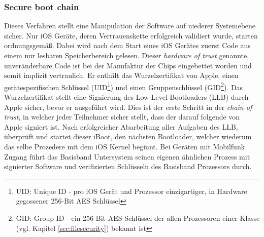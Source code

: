 	\subsubsection{Secure boot chain}\label{sec:secure-boot-chain}
		Dieses Verfahren stellt eine Manipulation der Software auf niederer
		Systemebene sicher.
		Nur iOS Geräte, deren Vertrauenskette erfolgreich validiert wurde, starten
		ordnungsgemäß. Dabei wird nach dem Start eines iOS Gerätes zuerst Code aus
		einem nur lesbaren Speicherbereich gelesen. Dieser \textit{hardware of
		trust} genannte, unveränderbare Code ist bei der
		Manufaktur der Chips eingebettet worden und somit implizit vertraulich.
		Er enthält das Wurzelzertifikat von Apple, einen gerätespezifischen
		Schlüssel (UID\footnote{UID: Unique ID - pro iOS Gerät und Prozessor einzigartiger,
		in Hardware gegossener 256-Bit AES Schlüssel}) und einen Gruppenschlüssel
		(GID\footnote{GID: Group ID - ein 256-Bit AES Schlüssel der allen
		Prozessoren einer Klasse (vgl. Kapitel \ref{sec:filesecurity}) bekannt ist}).
		Das Wurzelzertifikat stellt eine Signierung des Low-Level-Bootloaders (LLB)
		durch Apple sicher, bevor er ausgeführt wird.
		Dies ist der erste Schritt in der \textsl{chain of trust}, in welcher jeder
		Teilnehmer sicher stellt, dass der darauf folgende von Apple signiert ist. 		
		Nach erfolgreicher Abarbeitung aller Aufgaben des LLB, überprüft und startet
		dieser iBoot, den nächsten Bootloader, welcher wiederum das selbe Prozedere
		mit dem iOS Kernel beginnt. Bei Geräten mit Mobilfunk Zugang führt das
		Basisband Untersystem seinen eigenen ähnlichen Prozess mit signierter 
		Software und verifizierten Schlüsseln des Basisband Prozessors durch.
		
